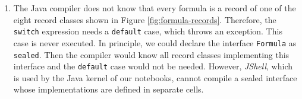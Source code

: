 \begin{enumerate}
\begin{enumerate}
            \\[0.2cm]
            \hspace*{1.3cm}
            \texttt{evaluate}($g \rightarrow h$, I) \quad has the same value as \quad
            \texttt{!evaluate($g$, I) || evaluate($h$, I)}.
      \item If $\odot = \leftrightarrow$ we exploit the fact that the formula $g \leftrightarrow h$ is \texttt{true} if and
            only if $g$ and $h$ have the same truth value.  Hence we
            can use the \textsl{Java} operator ``\texttt{==}''
            to combine the values of $g$ and $h$.
      \end{enumerate}
\item The Java compiler does not know that every formula is a record of one of the eight record classes
      shown in Figure \ref{fig:formula-records}.  Therefore, the \texttt{switch} expression needs a
      \texttt{default} case, which throws an exception.  This case is never executed.
      In principle, we could declare the interface \texttt{Formula} as \texttt{sealed}.  Then the compiler
      would know all record classes implementing this interface and the \texttt{default} case would not be
      needed.  However, \textsl{JShell}, which is used by the Java kernel of our notebooks, cannot compile a
      sealed interface whose implementations are defined in separate cells.
\end{enumerate}

